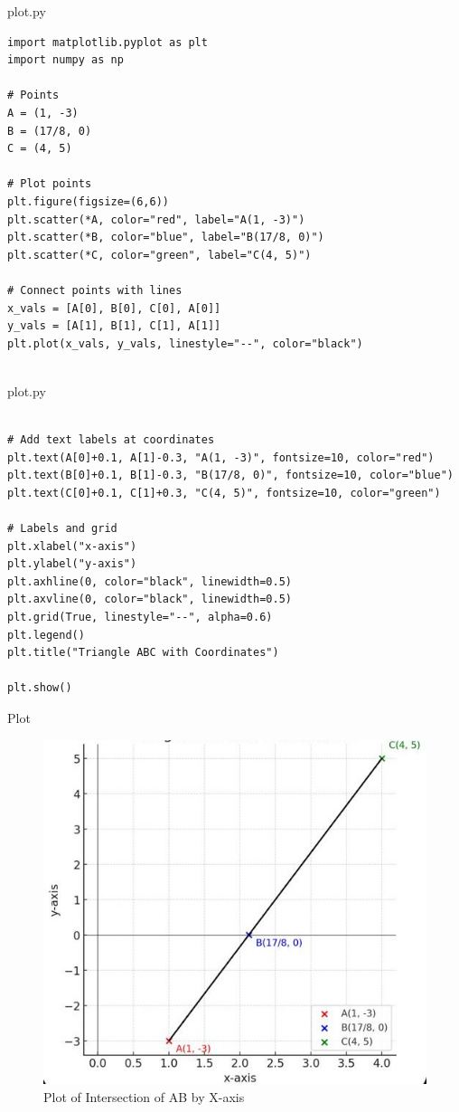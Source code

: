 \documentclass{beamer}
\begin{document}
\begin{frame}[fragile]{plot.py}
\begin{lstlisting}
import matplotlib.pyplot as plt
import numpy as np

# Points
A = (1, -3)
B = (17/8, 0)
C = (4, 5)

# Plot points
plt.figure(figsize=(6,6))
plt.scatter(*A, color="red", label="A(1, -3)")
plt.scatter(*B, color="blue", label="B(17/8, 0)")
plt.scatter(*C, color="green", label="C(4, 5)")

# Connect points with lines
x_vals = [A[0], B[0], C[0], A[0]]
y_vals = [A[1], B[1], C[1], A[1]]
plt.plot(x_vals, y_vals, linestyle="--", color="black")


\end{lstlisting}
\end{frame}

\begin{frame}[fragile]{plot.py}
\begin{lstlisting}

# Add text labels at coordinates
plt.text(A[0]+0.1, A[1]-0.3, "A(1, -3)", fontsize=10, color="red")
plt.text(B[0]+0.1, B[1]-0.3, "B(17/8, 0)", fontsize=10, color="blue")
plt.text(C[0]+0.1, C[1]+0.3, "C(4, 5)", fontsize=10, color="green")

# Labels and grid
plt.xlabel("x-axis")
plt.ylabel("y-axis")
plt.axhline(0, color="black", linewidth=0.5)
plt.axvline(0, color="black", linewidth=0.5)
plt.grid(True, linestyle="--", alpha=0.6)
plt.legend()
plt.title("Triangle ABC with Coordinates")

plt.show()

\end{lstlisting}
\end{frame}




\begin{frame}{Plot}
    \begin{figure}
        \centering
        \includegraphics[width=0.5\columnwidth]{figs/graph.png}
        \caption{Plot of Intersection of AB by X-axis}
        \label{fig:graph.png}
    \end{figure}
\end{frame}
\end{document}
